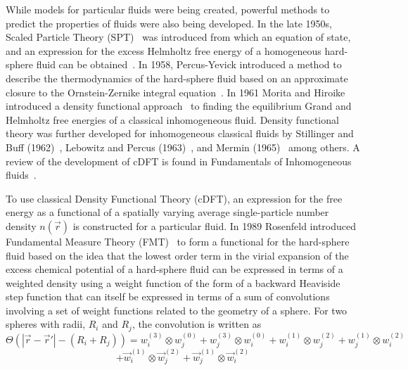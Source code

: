\documentclass[double,12pt]{beavtex}
\begin{document}
While models for particular fluids were being created, powerful methods 
to predict the properties of fluids were also being developed. 
In the late 1950s, Scaled Particle Theory (SPT)~\cite{ReissSPT} was 
introduced from which an equation of state, and an expression for the 
excess Helmholtz free energy of a homogeneous hard-sphere fluid can be 
obtained~\cite{Hansen}. 
In 1958, Percus-Yevick introduced a method to describe the thermodynamics 
of the hard-sphere fluid based on an approximate closure to the 
Ornstein-Zernike integral equation~\cite{PercusYevick}.
In 1961 Morita and Hiroike introduced a density functional 
approach~\cite{MoritaDFT} to finding the equilibrium Grand and Helmholtz free energies  
of a classical inhomogeneous fluid. 
Density functional theory was further developed for inhomogeneous classical fluids
by Stillinger and Buff (1962)~\cite{stillingerandbuff}, Lebowitz and 
Percus (1963)~\cite{lobowitzandpercus}, and Mermin (1965)~\cite{merium} among others. A review
of the development of cDFT is found in Fundamentals of Inhomogeneous fluids~\cite{inhomogeneousfluids}.

To use classical Density Functional Theory (cDFT), an expression for the free energy 
as a functional of a spatially varying average single-particle number density $n(\vec r)$
is constructed for a particular fluid.
In 1989 Rosenfeld introduced Fundamental Measure Theory (FMT)~\cite{rosenfeld1989,rosenfeld1988} 
to form a functional for the hard-sphere fluid based on the idea that 
the lowest order term in the virial expansion of the excess chemical 
potential of a hard-sphere fluid can 
be expressed in terms of a weighted density using a weight function 
of the form of 
a backward Heaviside step function
that can itself be expressed in terms of a sum of convolutions involving 
a set of weight functions related to the geometry of a sphere. 
For two spheres with radii, 
$R_i$  and $R_j$, the convolution is written as~\cite{rosenfeld1989}
\begin{displaymath}
   \Theta(|\vec r - \vec r'|-(R_i + R_j)) = w_i^{(3)} \otimes w_j^{(0)} + w_j^{(3)} \otimes w_i^{(0)} + w_i^{(1)} \otimes w_j^{(2)} + w_j^{(1)} \otimes w_i^{(2)}\end{displaymath}
\begin{equation}   + \vec w_i^{(1)} \otimes \vec w_j^{(2)} + \vec w_j^{(1)} \otimes \vec w_i^{(2)}
\end{equation}
\end{document}
